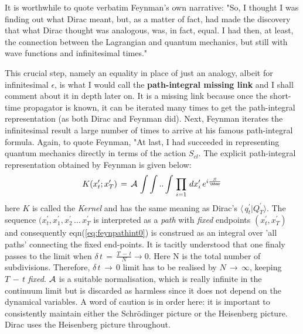 \documentclass[a4paper]{JHEP3}
\newcommand{\be}{\begin{equation}}
\newcommand{\ee}{\end{equation}}
\begin{document}
It is worthwhile to quote verbatim Feynman's own narrative: "So, I thought I was finding out what Dirac meant, but, as a matter of fact, 
had made the discovery that what Dirac thought was analogous, was, in fact, equal. I had then, at least, the connection between the 
Lagrangian and quantum mechanics, but still with wave functions and infinitesimal times."\cite{nobel}

This crucial step, namely an equality in place of just an analogy, albeit for infinitesimal $\epsilon$, is what I would call the 
{\bf path-integral missing link} and I shall comment about it in depth later on. It is a missing 
link because once the short-time propagator is known, it can be iterated many times to get the path-integral representation (as both Dirac
and Feynman did). Next, Feynman iterates the infinitesimal result a large number of times to arrive at his famous path-integral formula. 
Again, to quote Feynman, "At last, I had succeeded in representing quantum mechanics directly in terms of the action $S_{cl}$. The
explicit path-integral representation obtained by Feynman is given below:
\be
\label{eq:feynpathint0}
K(x_t^\prime;x_T^\prime)\,=\,{\cal A}\,\int\int..\int\,\prod_{i=1}\,dx_i^\prime\,e^{i\frac{S}{\hbar}}
\ee
here $K$ is called the {\it Kernel} and has the same meaning as Dirac's $\langle\,q_t^\prime|Q_T^\prime\rangle$. The sequence 
$(x_t^\prime, x_1^\prime,x_2^\prime\,\ldots\,x_T^\prime$ is interpreted as a {\it path} with {\it fixed} endpoints $(x_t^\prime,x_T^\prime)$ 
and consequently eqn(\ref{eq:feynpathint0}) is construed as an
integral over 'all paths' connecting the fixed end-points. It is tacitly understood that one finaly passes to the limit when 
$\delta\,t\,=\,\frac{T\,-\,t}{N} \rightarrow 0$. Here N is the total number of subdivisions. Therefore, $\delta\,t\,\rightarrow\,0$ limit 
has to be realised by $N\,\rightarrow\,\infty$, keeping $T\,-\,t$ \emph{fixed}. ${\cal A}$ is a suitable normalisation, which is really infinite in the continuum limit but 
is discarded as harmless since it does not depend on the dynamical variables. A word of caution is in order here: it is important to consistently maintain either
the Schr\"odinger picture or the Heisenberg picture. Dirac uses the Heisenberg picture throughout. 
\end{document}
